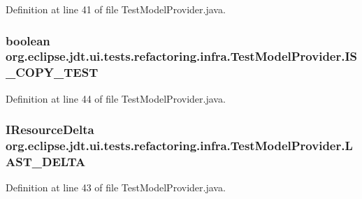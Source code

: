 Definition at line 41 of file TestModelProvider.java.

\hypertarget{classorg_1_1eclipse_1_1jdt_1_1ui_1_1tests_1_1refactoring_1_1infra_1_1TestModelProvider_afeec450fba96b7a08c116bdb00def0f2}{
\subsubsection[{IS\_\-COPY\_\-TEST}]{\setlength{\rightskip}{0pt plus 5cm}boolean {\bf org.eclipse.jdt.ui.tests.refactoring.infra.TestModelProvider.IS\_\-COPY\_\-TEST}}}
\label{classorg_1_1eclipse_1_1jdt_1_1ui_1_1tests_1_1refactoring_1_1infra_1_1TestModelProvider_afeec450fba96b7a08c116bdb00def0f2}


Definition at line 44 of file TestModelProvider.java.

\hypertarget{classorg_1_1eclipse_1_1jdt_1_1ui_1_1tests_1_1refactoring_1_1infra_1_1TestModelProvider_a34af87493dbe2276d2bf42a910f5111d}{
\subsubsection[{LAST\_\-DELTA}]{\setlength{\rightskip}{0pt plus 5cm}IResourceDelta {\bf org.eclipse.jdt.ui.tests.refactoring.infra.TestModelProvider.LAST\_\-DELTA}}}
\label{classorg_1_1eclipse_1_1jdt_1_1ui_1_1tests_1_1refactoring_1_1infra_1_1TestModelProvider_a34af87493dbe2276d2bf42a910f5111d}


Definition at line 43 of file TestModelProvider.java.

